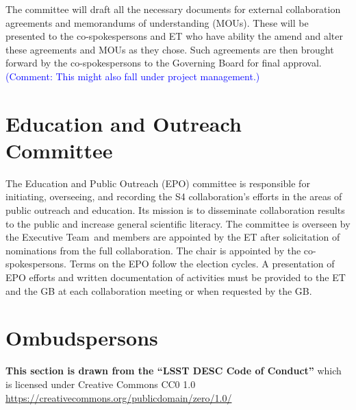 \documentclass[12pt]{article}
\newcommand{\Comment}[1]{\textcolor{Blue}{(Comment: #1)}}
\newcommand{\exec}{{Executive Team}}
\newcommand{\shorte}{{ET }}  %
\begin{document}
The committee will draft all the necessary documents for external collaboration agreements and memorandums of understanding (MOUs). These will be presented to the co-spokespersons and \shorte who have ability the amend and alter these agreements and MOUs as they chose. Such agreements are then brought forward by the co-spokespersons to the Governing Board for final approval. \Comment{This might also fall under project management.}

\section{Education and Outreach Committee}

The Education and Public Outreach (EPO) committee is responsible for initiating, overseeing, and recording the S4 collaboration's efforts in the areas of public outreach and education. Its mission is to disseminate collaboration results to the public and increase general scientific literacy. The committee is overseen by the \exec \ and members are appointed by the \shorte after solicitation of nominations from the full collaboration. The chair is appointed by the co-spokespersons. Terms on the EPO follow the election cycles. A presentation of EPO efforts and written documentation of activities must be provided to the \shorte and the GB at each collaboration meeting or when requested by the GB. 



\section{Ombudspersons}

{\bf This section is drawn from the “LSST DESC Code of Conduct”} which is licensed under Creative Commons CC0 1.0 \url{https://creativecommons.org/publicdomain/zero/1.0/}
\end{document}
